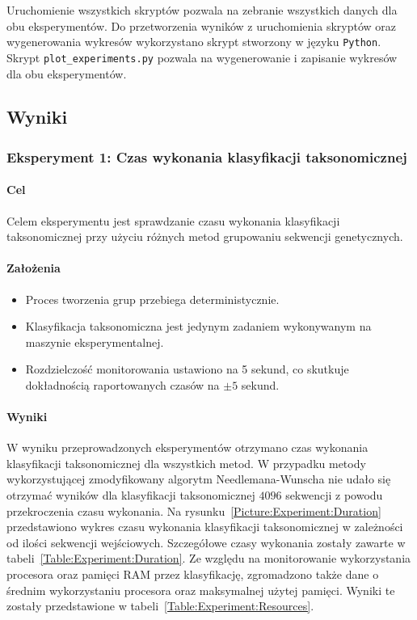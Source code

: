             Uruchomienie wszystkich skryptów pozwala na zebranie wszystkich danych dla obu eksperymentów. Do przetworzenia wyników z uruchomienia skryptów oraz wygenerowania wykresów wykorzystano skrypt stworzony w języku \texttt{Python}. Skrypt \texttt{plot\_experiments.py} pozwala na wygenerowanie i zapisanie wykresów dla obu eksperymentów.

    \subsection{Wyniki}

        \subsubsection{Eksperyment 1: Czas wykonania klasyfikacji taksonomicznej}

            \paragraph{Cel}
                Celem eksperymentu jest sprawdzanie czasu wykonania klasyfikacji taksonomicznej przy użyciu różnych metod grupowaniu sekwencji genetycznych. 

            \paragraph{Założenia}
                \begin{itemize}
                    \item {
                        Proces tworzenia grup przebiega deterministycznie.
                    }
                    \item {
                        Klasyfikacja taksonomiczna jest jedynym zadaniem wykonywanym na maszynie eksperymentalnej.
                    }
                    \item {
                        Rozdzielczość monitorowania ustawiono na 5 sekund, co skutkuje dokładnością raportowanych czasów na $\pm 5$ sekund.
                    }
                \end{itemize}

            \paragraph{Wyniki}
                W wyniku przeprowadzonych eksperymentów otrzymano czas wykonania klasyfikacji taksonomicznej dla wszystkich metod. W przypadku metody wykorzystującej zmodyfikowany algorytm Needlemana-Wunscha nie udało się otrzymać wyników dla klasyfikacji taksonomicznej $4096$ sekwencji z powodu przekroczenia czasu wykonania. Na rysunku~\ref{Picture:Experiment:Duration} przedstawiono wykres czasu wykonania klasyfikacji taksonomicznej w zależności od ilości sekwencji wejściowych. Szczegółowe czasy wykonania zostały zawarte w tabeli~\ref{Table:Experiment:Duration}. Ze względu na monitorowanie wykorzystania procesora oraz pamięci RAM przez klasyfikację, zgromadzono także dane o średnim wykorzystaniu procesora oraz maksymalnej użytej pamięci. Wyniki te zostały przedstawione w tabeli~\ref{Table:Experiment:Resources}.

